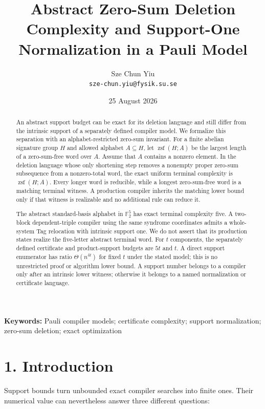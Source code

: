 \documentclass[
  11pt,
]{article}
\title{Abstract Zero-Sum Deletion Complexity and Support-One Normalization in a Pauli Model}
\author{Sze Chun Yiu\\\texttt{sze-chun.yiu@fysik.su.se}}
\date{25 August 2026}
\begin{document}
\maketitle

\begin{abstract}
An abstract support budget can be exact for its deletion language and
still differ from the intrinsic support of a separately defined compiler
model. We formalize this separation with an alphabet-restricted zero-sum
invariant. For a finite abelian signature group \(H\) and allowed
alphabet \(A\subseteq H\), let \(\operatorname{zsf}(H; A)\) be the
largest length of a zero-sum-free word over \(A\). Assume that \(A\)
contains a nonzero element. In the deletion language whose only
shortening step removes a nonempty proper zero-sum subsequence from a
nonzero-total word, the exact uniform terminal complexity is
\(\operatorname{zsf}(H; A)\). Every longer word is reducible, while a
longest zero-sum-free word is a matching terminal witness. A production
compiler inherits the matching lower bound only if that witness is
realizable and no additional rule can reduce it.

The abstract standard-basis alphabet in \(\mathbb F_2^5\) has exact
terminal complexity five. A two-block dependent-triple compiler using
the same syndrome coordinates admits a whole-system Tag relocation with
intrinsic support one. We do not assert that its production states
realize the five-letter abstract terminal word. For \(t\) components,
the separately defined certificate and product-support budgets are
\(5t\) and \(t\). A direct support enumerator has ratio
\(\Theta(n^{4t})\) for fixed \(t\) under the stated model; this is no
unrestricted proof or algorithm lower bound. A support number belongs to
a compiler only after an intrinsic lower witness; otherwise it belongs
to a named normalization or certificate language.

\end{abstract}

\noindent\textbf{Keywords:} Pauli compiler models; certificate complexity;
support normalization; zero-sum deletion; exact optimization

\hypertarget{introduction}{%
\section{1. Introduction}\label{introduction}}

Support bounds turn unbounded exact compiler searches into finite ones.
Their numerical value can nevertheless answer three different questions:
\end{document}
